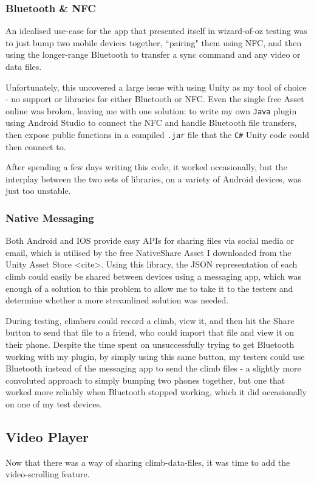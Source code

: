 \subsubsection{Bluetooth & NFC}
An idealised use-case for the app that presented itself in wizard-of-oz testing was to just bump two mobile devices together, ``pairing" them using NFC, and then using the longer-range Bluetooth to transfer a sync command and any video or data files.

Unfortunately, this uncovered a large issue with using Unity as my tool of choice - no support or libraries for either Bluetooth or NFC. 
Even the single free Asset online was broken, leaving me with one solution: to write my own \verb|Java| plugin using Android Studio to connect the NFC and handle Bluetooth file transfers, then expose public functions in a compiled \verb|.jar| file that the \verb|C#| Unity code could then connect to.

After spending a few days writing this code, it worked occasionally, but the interplay between the two sets of libraries, on a variety of Android devices, was just too unstable.

\subsubsection{Native Messaging}
Both Android and IOS provide easy APIs for sharing files via social media or email, which is utilised by the free NativeShare Asset I downloaded from the Unity Asset Store <cite>.
Using this library, the JSON representation of each climb could easily be shared between devices using a messaging app, which was enough of a solution to this problem to allow me to take it to the testers and determine whether a more streamlined solution was needed.

During testing, climbers could record a climb, view it, and then hit the Share button to send that file to a friend, who could import that file and view it on their phone.
Despite the time spent on unsuccessfully trying to get Bluetooth working with my plugin, by simply using this same button, my testers could use Bluetooth instead of the messaging app to send the climb files - a slightly more convoluted approach to simply bumping two phones together, but one that worked more reliably when Bluetooth stopped working, which it did occasionally on one of my test devices.



\subsection{Video Player}
Now that there was a way of sharing climb-data-files, it was time to add the video-scrolling feature.

